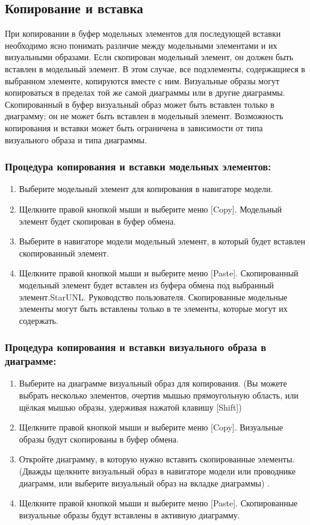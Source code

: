 \documentclass[a4paper,12pt]{report}
\begin{document}
\subsection*{Копирование и вставка}
При копировании в буфер модельных элементов для последующей вставки необходимо ясно
понимать различие между модельными элементами и их визуальными образами. Если скопирован
модельный элемент, он должен быть вставлен в модельный элемент. В этом случае, все
подэлементы, содержащиеся в выбранном элементе, копируются вместе с ним. Визуальные образы
могут копироваться в пределах той же самой диаграммы или в другие диаграммы. Скопированный
в буфер визуальный образ может быть вставлен только в диаграмму; он не может быть вставлен в
модельный элемент. Возможность копирования и вставки может быть ограничена в зависимости от
типа визуального образа и типа диаграммы.

\subsubsection*{Процедура копирования и вставки модельных элементов:}
\begin{enumerate}
	\item Выберите модельный элемент для копирования в навигаторе модели.
	\item  Щелкните правой кнопкой мыши и выберите меню [Copy]. Модельный элемент будет
	скопирован в буфер обмена.
	\item Выберите в навигаторе модели модельный элемент, в который будет вставлен
	скопированный элемент.
	\item Щелкните правой кнопкой мыши и выберите меню [Paste]. Скопированный модельный
	элемент будет вставлен из буфера обмена под выбранный элемент.StarUNL. Руководство пользователя. Скопированные модельные элементы могут быть вставлены только в те элементы, которые
	могут их содержать.
\end{enumerate}

\subsubsection*{Процедура копирования и вставки визуального образа в диаграмме:}
\begin{enumerate}
	\item Выберите на диаграмме визуальный образ для копирования. (Вы можете выбрать несколько
	элементов, очертив мышью прямоугольную область, или щёлкая мышью образы, удерживая
	нажатой клавишу [Shift])
	\item Щелкните правой кнопкой мыши и выберите меню [Copy]. Визуальные образы будут
	скопированы в буфер обмена.
	\item Откройте диаграмму, в которую нужно вставить скопированные элементы. (Дважды
	щелкните визуальный образ в навигаторе модели или проводнике диаграмм, или выберите
	визуальный образ на вкладке диаграммы) .
	\item Щелкните правой кнопкой мыши и выберите меню [Paste]. Скопированные визуальные
	образы будут вставлены в активную диаграмму.
\end{enumerate}
\newpage
\end{document}
